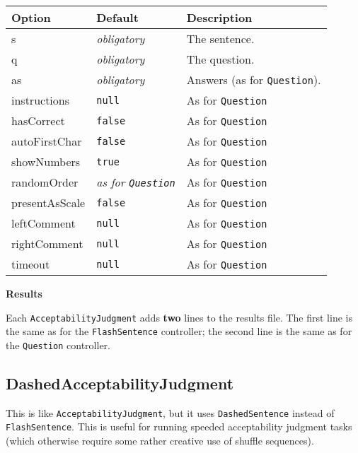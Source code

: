 \documentclass[
]{article}
\begin{document}
\begin{RaggedRight}\small\begin{longtable}[]{p{1.7in}p{1in}p{3.15in}}
\toprule
\textbf{Option} & \textbf{Default} & \textbf{Description}\tabularnewline
\midrule
\endhead
s & \emph{obligatory} & The sentence.\tabularnewline
q & \emph{obligatory} & The question.\tabularnewline
as & \emph{obligatory} & Answers (as for
\texttt{Question}).\tabularnewline
instructions & \texttt{null} & As for \texttt{Question}\tabularnewline
hasCorrect & \texttt{false} & As for \texttt{Question}\tabularnewline
autoFirstChar & \texttt{false} & As for \texttt{Question}\tabularnewline
showNumbers & \texttt{true} & As for \texttt{Question}\tabularnewline
randomOrder & \emph{as for \texttt{Question}} & As for
\texttt{Question}\tabularnewline
presentAsScale & \texttt{false} & As for
\texttt{Question}\tabularnewline
leftComment & \texttt{null} & As for \texttt{Question}\tabularnewline
rightComment & \texttt{null} & As for \texttt{Question}\tabularnewline
timeout & \texttt{null} & As for \texttt{Question}\tabularnewline
\bottomrule
\end{longtable}\normalsize\end{RaggedRight}

\textbf{Results}

Each \texttt{AcceptabilityJudgment} adds \textbf{two} lines to the
results file. The first line is the same as for the
\texttt{FlashSentence} controller; the second line is the same as for
the \texttt{Question} controller.

\hypertarget{dashedacceptabilityjudgment}{%
\subsection{DashedAcceptabilityJudgment}\label{dashedacceptabilityjudgment}}

This is like \texttt{AcceptabilityJudgment}, but it uses
\texttt{DashedSentence} instead of \texttt{FlashSentence}. This is
useful for running speeded acceptability judgment tasks (which otherwise
require some rather creative use of shuffle sequences).
\end{document}
